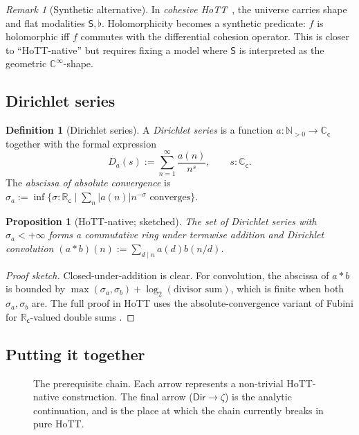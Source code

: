 \documentclass[12pt]{article}
\newtheorem{proposition}[theorem]{Proposition}
\theoremstyle{definition}
\newtheorem{definition}[theorem]{Definition}
\theoremstyle{remark}
\newtheorem{remark}[theorem]{Remark}
\newcommand{\C}{\mathbb{C}}
\newcommand{\R}{\mathbb{R}}
\newcommand{\Q}{\mathbb{Q}}
\newcommand{\N}{\mathbb{N}}
\newcommand{\Cc}{\C_{\mathsf{c}}}
\newcommand{\Rc}{\R_{\mathsf{c}}}
\newcommand{\holo}{\mathsf{Holo}}
\newcommand{\esh}{\mathsf{S}}      %
\begin{document}
\begin{remark}[Synthetic alternative]\label{rem:synth}
In \emph{cohesive HoTT}~\cite{Shulman2018Cohesive}, the universe carries
shape and flat modalities $\esh, \flat$. Holomorphicity becomes a synthetic
predicate: $f$ is holomorphic iff $f$ commutes with the differential cohesion
operator. This is closer to ``HoTT-native'' but requires fixing a model
where $\esh$ is interpreted as the geometric $\C^\infty$-shape.
\end{remark}

\subsection{Dirichlet series}

\begin{definition}[Dirichlet series]\label{def:Dirichlet}
A \emph{Dirichlet series} is a function $a:\N_{>0} \to \Cc$ together with the
formal expression
\[
D_a(s) := \sum_{n=1}^{\infty} \frac{a(n)}{n^s}, \qquad s:\Cc.
\]
The \emph{abscissa of absolute convergence} is
$\sigma_a := \inf\{\sigma:\Rc \mid \sum_n |a(n)| n^{-\sigma} \text{ converges}\}$.
\end{definition}

\begin{proposition}[HoTT-native; sketched]\label{prop:DirichletAlgebra}
The set of Dirichlet series with $\sigma_a < +\infty$ forms a commutative
ring under termwise addition and Dirichlet convolution
$(a*b)(n) := \sum_{d \mid n} a(d) b(n/d)$.
\end{proposition}

\begin{proof}[Proof sketch]
Closed-under-addition is clear. For convolution, the abscissa of
$a*b$ is bounded by $\max(\sigma_a, \sigma_b) + \log_2(\text{divisor sum})$,
which is finite when both $\sigma_a, \sigma_b$ are. The full proof in HoTT
uses the absolute-convergence variant of Fubini for $\Rc$-valued double sums
\cite{Booij2020}.
\end{proof}

\subsection{Putting it together}

\begin{figure}[htbp]
\centering
{}
\caption{The prerequisite chain. Each arrow represents a non-trivial
HoTT-native construction. The final arrow ($\mathsf{Dir} \to \zeta$) is the
analytic continuation, and is the place at which the chain currently breaks
in pure HoTT.}
\label{fig:chain}
\end{figure}
\end{document}
